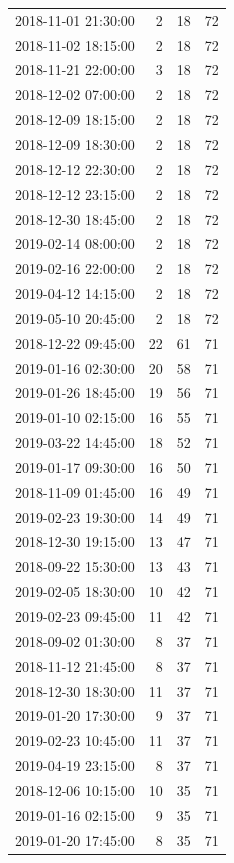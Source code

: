 \begin{tabular}{lrrr}
2018-11-01 21:30:00 & 2 & 18 & 72 \\
2018-11-02 18:15:00 & 2 & 18 & 72 \\
2018-11-21 22:00:00 & 3 & 18 & 72 \\
2018-12-02 07:00:00 & 2 & 18 & 72 \\
2018-12-09 18:15:00 & 2 & 18 & 72 \\
2018-12-09 18:30:00 & 2 & 18 & 72 \\
2018-12-12 22:30:00 & 2 & 18 & 72 \\
2018-12-12 23:15:00 & 2 & 18 & 72 \\
2018-12-30 18:45:00 & 2 & 18 & 72 \\
2019-02-14 08:00:00 & 2 & 18 & 72 \\
2019-02-16 22:00:00 & 2 & 18 & 72 \\
2019-04-12 14:15:00 & 2 & 18 & 72 \\
2019-05-10 20:45:00 & 2 & 18 & 72 \\
2018-12-22 09:45:00 & 22 & 61 & 71 \\
2019-01-16 02:30:00 & 20 & 58 & 71 \\
2019-01-26 18:45:00 & 19 & 56 & 71 \\
2019-01-10 02:15:00 & 16 & 55 & 71 \\
2019-03-22 14:45:00 & 18 & 52 & 71 \\
2019-01-17 09:30:00 & 16 & 50 & 71 \\
2018-11-09 01:45:00 & 16 & 49 & 71 \\
2019-02-23 19:30:00 & 14 & 49 & 71 \\
2018-12-30 19:15:00 & 13 & 47 & 71 \\
2018-09-22 15:30:00 & 13 & 43 & 71 \\
2019-02-05 18:30:00 & 10 & 42 & 71 \\
2019-02-23 09:45:00 & 11 & 42 & 71 \\
2018-09-02 01:30:00 & 8 & 37 & 71 \\
2018-11-12 21:45:00 & 8 & 37 & 71 \\
2018-12-30 18:30:00 & 11 & 37 & 71 \\
2019-01-20 17:30:00 & 9 & 37 & 71 \\
2019-02-23 10:45:00 & 11 & 37 & 71 \\
2019-04-19 23:15:00 & 8 & 37 & 71 \\
2018-12-06 10:15:00 & 10 & 35 & 71 \\
2019-01-16 02:15:00 & 9 & 35 & 71 \\
2019-01-20 17:45:00 & 8 & 35 & 71 \\

\end{tabular}
